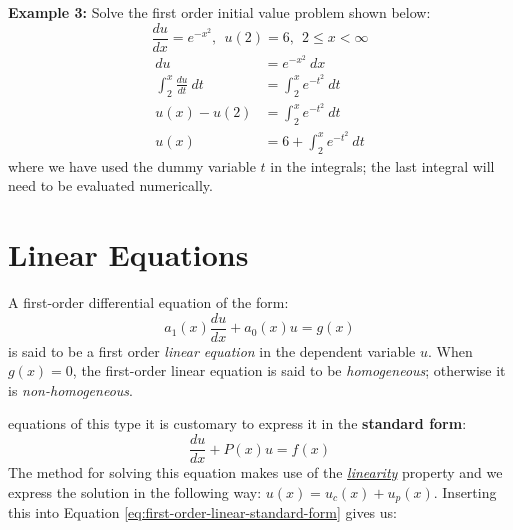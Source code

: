 \begin{example}[h!]
\textbf{Example 3:}
Solve the first order initial value problem shown below:
\begin{equation*}
\frac{du}{dx} = e^{-x^2}, \ \ u(2) = 6, \ \ 2 \le x < \infty
\end{equation*}
\begin{align*}
du &= e^{-x^2}\ dx \\
\int_2^{x} \frac{du}{dt} \ dt &= \int_{2}^{x} e^{-t^2} \ dt \\
u(x) - u(2) &= \int_{2}^{x} e^{-t^2} \ dt \\
u(x) &= 6 + \int_{2}^{x} e^{-t^2} \ dt
\end{align*}
where we have used the dummy variable $t$ in the integrals; the last integral will need to be evaluated numerically.

\end{example}

\section{Linear Equations}
A first-order differential equation of the form:
\begin{equation}
a_1(x)\frac{du}{dx} + a_0(x)u = g(x)
\label{eq:lin_first_order}
\end{equation}
is said to be a first order \emph{linear equation} in the dependent variable $u$.
When $g(x) = 0$, the first-order linear equation is said to be \emph{homogeneous}; otherwise it is \emph{non-homogeneous}.

 equations of this type it is customary to express it in the \textbf{standard form}: 
\begin{equation}
\frac{du}{dx}+P(x)u = f(x)
\label{eq:first-order-linear-standard-form}
\end{equation}  
The method for solving this equation makes use of the \underline{\emph{linearity}} property and we express the solution in the following way: $u(x) = u_c(x) + u_p(x)$. Inserting this into Equation \ref{eq:first-order-linear-standard-form} gives us:

